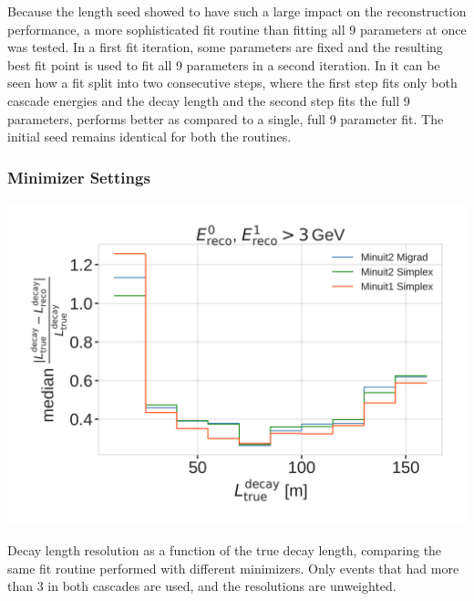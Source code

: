 Because the length seed showed to have such a large impact on the reconstruction performance, a more sophisticated fit routine than fitting all 9 parameters at once was tested. In a first fit iteration, some parameters are fixed and the resulting best fit point is used to fit all 9 parameters in a second iteration. In  it can be seen how a fit split into two consecutive steps, where the first step fits only both cascade energies and the decay length and the second step fits the full 9 parameters, performs better as compared to a single, full 9 parameter fit. The initial seed remains identical for both the routines.


\subsubsection{Minimizer Settings}

\begin{marginfigure}
	\centering
    \includegraphics{figures/results/190605_reco_optimization/minimizer_checks_median_decay_length_resolution_Good + L7 + reco E1,E2 above 3.png}
    \caption[Decay length resolution to optimize minimizer settings]{Decay length resolution as a function of the true decay length, comparing the same fit routine performed with different minimizers. Only events that had more than \SI{3}{\gev} in both cascades are used, and the resolutions are unweighted.}
\end{marginfigure}

